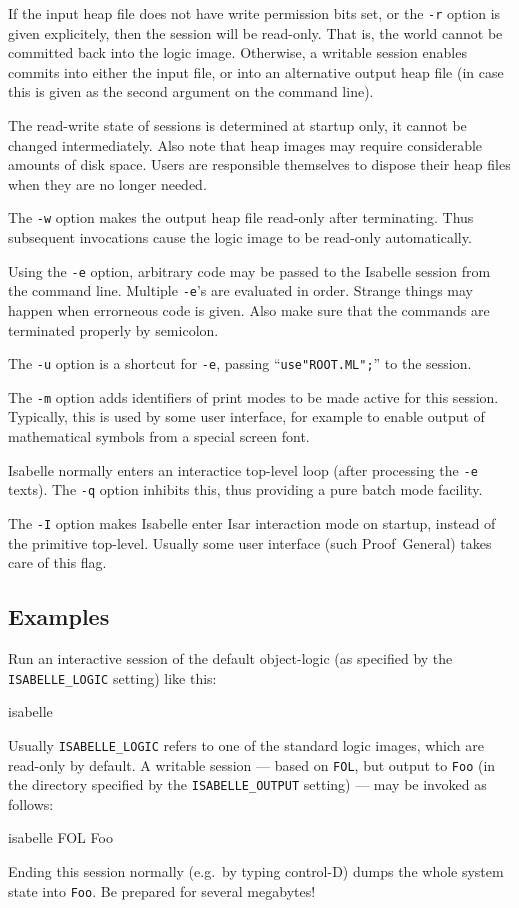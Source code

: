 If the input heap file does not have write permission bits set, or the
\texttt{-r} option is given explicitely, then the session will be
read-only. That is, the {\ML} world cannot be committed back into the
logic image.  Otherwise, a writable session enables commits into
either the input file, or into an alternative output heap file (in
case this is given as the second argument on the command line).

The read-write state of sessions is determined at startup only, it
cannot be changed intermediately. Also note that heap images may
require considerable amounts of disk space. Users are responsible
themselves to dispose their heap files when they are no longer needed.

\medskip The \texttt{-w} option makes the output heap file read-only
after terminating.  Thus subsequent invocations cause the logic image
to be read-only automatically.

\medskip Using the \texttt{-e} option, arbitrary {\ML} code may be
passed to the Isabelle session from the command line. Multiple
\texttt{-e}'s are evaluated in order. Strange things may happen when
errorneous {\ML} code is given. Also make sure that the {\ML} commands
are terminated properly by semicolon.

\medskip The \texttt{-u} option is a shortcut for \texttt{-e}, passing
``\texttt{use"ROOT.ML";}'' to the {\ML} session.

\medskip The \texttt{-m} option adds identifiers of print modes to be
made active for this session. Typically, this is used by some user
interface, for example to enable output of mathematical symbols from a
special screen font.

\medskip Isabelle normally enters an interactice top-level loop (after
processing the \texttt{-e} texts). The \texttt{-q} option inhibits this, thus
providing a pure batch mode facility.

\medskip The \texttt{-I} option makes Isabelle enter Isar interaction mode on
startup, instead of the primitive {\ML} top-level.  Usually some user
interface (such Proof~General) takes care of this flag.


\subsection*{Examples}

Run an interactive session of the default object-logic (as specified
by the \texttt{ISABELLE_LOGIC} setting) like this:
\begin{ttbox}
isabelle
\end{ttbox}
Usually \texttt{ISABELLE_LOGIC} refers to one of the standard logic
images, which are read-only by default.  A writable session --- based
on \texttt{FOL}, but output to \texttt{Foo} (in the directory
specified by the \texttt{ISABELLE_OUTPUT} setting) --- may be invoked
as follows:
\begin{ttbox}
isabelle FOL Foo
\end{ttbox}
Ending this session normally (e.g.\ by typing control-D) dumps the
whole {\ML} system state into \texttt{Foo}. Be prepared for several
megabytes!


